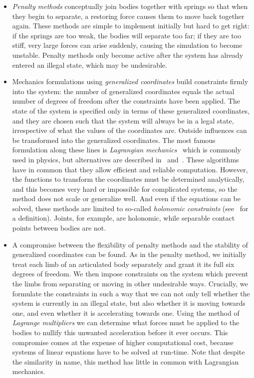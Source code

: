 \begin{itemize}
\item \emph{Penalty methods} conceptually join bodies together with springs so that when they
    begin to separate, a restoring force causes them to move back together again. These methods
    are simple to implement initially but hard to get right: if the springs are too weak, the
    bodies will separate too far; if they are too stiff, very large forces can arise suddenly,
    causing the simulation to become unstable. Penalty methods only become active after the
    system has already entered an illegal state, which may be undesirable.

\item Mechanics formulations using \emph{generalized coordinates} build constraints firmly into
    the system: the number of generalized coordinates equals the actual number of degrees of
    freedom after the constraints have been applied. The state of the system is specified only in
    terms of these generalized coordinates, and they are chosen such that the system will always
    be in a legal state, irrespective of what the values of the coordinates are. Outside
    influences can be transformed into the generalized coordinates. The most famous formulation
    along these lines is \emph{Lagrangian mechanics}~\cite{Hand:98,Goldstein:80} which is
    commonly used in physics, but alternatives are described in~\cite{Wilhelms:91}
    and~\cite{Featherstone:87}.
    These algorithms have in common that they allow efficient and reliable computation. However,
    the functions to transform the coordinates must be determined analytically, and this becomes
    very hard or impossible for complicated systems, so the method does not scale or generalize
    well. And even if the equations can be solved, these methods are limited to so-called
    \emph{holonomic constraints} (see~\cite{Hand:98} for a definition). Joints, for example,
    are holonomic, while separable contact points between bodies are not.

\item A compromise between the flexibility of penalty methods and the stability of generalized
    coordinates can be found. As in the penalty method, we initially treat each limb of an
    articulated body separately and grant it its full six degrees of freedom. We then impose
    constraints on the system which prevent the limbs from separating or moving in other
    undesirable ways. Crucially, we formulate the constraints in such a way that we can not only
    tell whether the system is currently in an illegal state, but also whether it is moving
    towards one, and even whether it is accelerating towards one. Using the method of
    \emph{Lagrange multipliers} we can determine what forces must be applied to the bodies to
    nullify this unwanted acceleration before it ever occurs. This compromise comes at the expense
    of higher computational cost, because systems of linear equations have to be solved at
    run-time. Note that despite the similarity in name, this method has little in common with
    Lagrangian mechanics.
\end{itemize}

